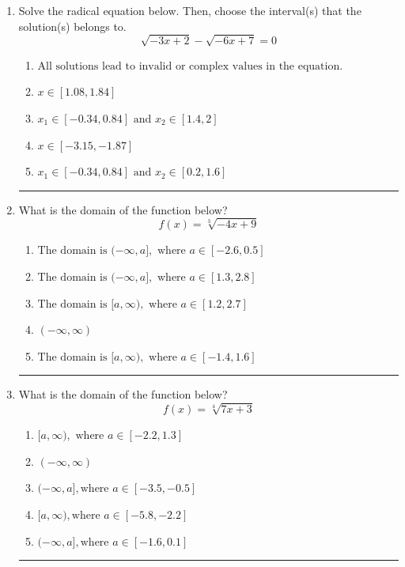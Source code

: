 \documentclass[14pt]{extbook}
\newcommand{\litem}[1]{\item#1\hspace*{-1cm}\rule{\textwidth}{0.4pt}}
\begin{document}
\begin{enumerate}
{\begin{enumerate}[label=\Alph*.]
\end{enumerate} }
\litem{
Solve the radical equation below. Then, choose the interval(s) that the solution(s) belongs to.\[ \sqrt{-3 x + 2} - \sqrt{-6 x + 7} = 0 \]\begin{enumerate}[label=\Alph*.]
\item \( \text{All solutions lead to invalid or complex values in the equation.} \)
\item \( x \in [1.08,1.84] \)
\item \( x_1 \in [-0.34, 0.84] \text{ and } x_2 \in [1.4,2] \)
\item \( x \in [-3.15,-1.87] \)
\item \( x_1 \in [-0.34, 0.84] \text{ and } x_2 \in [0.2,1.6] \)

\end{enumerate} }
\litem{
What is the domain of the function below?\[ f(x) = \sqrt[3]{-4 x + 9} \]\begin{enumerate}[label=\Alph*.]
\item \( \text{The domain is } (-\infty, a], \text{   where } a \in [-2.6, 0.5] \)
\item \( \text{The domain is } (-\infty, a], \text{   where } a \in [1.3, 2.8] \)
\item \( \text{The domain is } [a, \infty), \text{   where } a \in [1.2, 2.7] \)
\item \( (-\infty, \infty) \)
\item \( \text{The domain is } [a, \infty), \text{   where } a \in [-1.4, 1.6] \)

\end{enumerate} }
\litem{
What is the domain of the function below?\[ f(x) = \sqrt[4]{7 x + 3} \]\begin{enumerate}[label=\Alph*.]
\item \( [a, \infty), \text{ where } a \in [-2.2, 1.3] \)
\item \( (-\infty, \infty) \)
\item \( (-\infty, a], \text{where } a \in [-3.5, -0.5] \)
\item \( [a, \infty), \text{where } a \in [-5.8, -2.2] \)
\item \( (-\infty, a], \text{where } a \in [-1.6, 0.1] \)


\end{enumerate}}
\end{enumerate}
\end{document}
